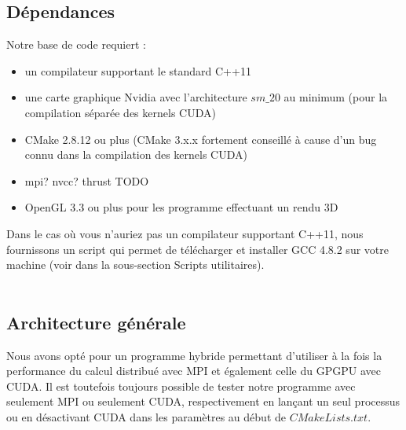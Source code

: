 \documentclass[12pt,a4paper,sans]{article}
\begin{document}
\subsection{Dépendances}
Notre base de code requiert :
\begin{itemize}
    \item un compilateur supportant le standard C++11
    \item une carte graphique Nvidia avec l'architecture $sm\_20$ au minimum (pour la compilation séparée des kernels CUDA)
    \item CMake 2.8.12 ou plus (CMake 3.x.x fortement conseillé à cause d'un bug connu dans la compilation des kernels CUDA)
    \item mpi? nvcc? thrust TODO 
    \item OpenGL 3.3 ou plus pour les programme effectuant un rendu 3D
\end{itemize}

Dans le cas où vous n'auriez pas un compilateur supportant C++11, nous fournissons un script qui permet de télécharger et installer GCC 4.8.2 sur votre machine (voir dans la sous-section Scripts utilitaires).\\\\

\subsection{Architecture générale}
Nous avons opté pour un programme hybride permettant d'utiliser à la fois la performance du calcul distribué avec MPI et également celle du GPGPU avec CUDA. Il est toutefois toujours possible de tester notre programme avec seulement MPI ou seulement CUDA, respectivement en lançant un seul processus ou en désactivant CUDA dans les paramètres au début de $CMakeLists.txt$.\\\\
\end{document}
